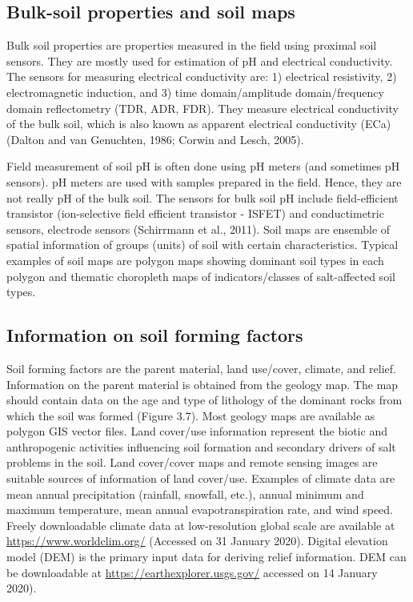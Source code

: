 \documentclass[
  10pt,
  b5paper,
]{book}
\begin{document}
\hypertarget{bulk-soil-properties-and-soil-maps}{%
\subsection{Bulk-soil properties and soil maps}\label{bulk-soil-properties-and-soil-maps}}

Bulk soil properties are properties measured in the field using proximal soil sensors. They are mostly used for estimation of pH and electrical conductivity. The sensors for measuring electrical conductivity are: 1) electrical resistivity, 2) electromagnetic induction, and 3) time domain/amplitude domain/frequency domain reflectometry (TDR, ADR, FDR). They measure electrical conductivity of the bulk soil, which is also known as apparent electrical conductivity (ECa) (Dalton and van Genuchten, 1986; Corwin and Lesch, 2005).

Field measurement of soil pH is often done using pH meters (and sometimes pH sensors). pH meters are used with samples prepared in the field. Hence, they are not really pH of the bulk soil. The sensors for bulk soil pH include field-efficient transistor (ion-selective field efficient transistor - ISFET) and conductimetric sensors, electrode sensors (Schirrmann et al., 2011).
Soil maps are ensemble of spatial information of groups (units) of soil with certain characteristics. Typical examples of soil maps are polygon maps showing dominant soil types in each polygon and thematic choropleth maps of indicators/classes of salt-affected soil types.

\hypertarget{information-on-soil-forming-factors}{%
\subsection{Information on soil forming factors}\label{information-on-soil-forming-factors}}

Soil forming factors are the parent material, land use/cover, climate, and relief. Information on the parent material is obtained from the geology map. The map should contain data on the age and type of lithology of the dominant rocks from which the soil was formed (Figure 3.7). Most geology maps are available as polygon GIS vector files.
Land cover/use information represent the biotic and anthropogenic activities influencing soil formation and secondary drivers of salt problems in the soil. Land cover/cover maps and remote sensing images are suitable sources of information of land cover/use. Examples of climate data are mean annual precipitation (rainfall, snowfall, etc.), annual minimum and maximum temperature, mean annual evapotranspiration rate, and wind speed. Freely downloadable climate data at low-resolution global scale are available at \url{https://www.worldclim.org/} (Accessed on 31 January 2020). Digital elevation model (DEM) is the primary input data for deriving relief information. DEM can be downloadable at \url{https://earthexplorer.usgs.gov/} accessed on 14 January 2020).
\end{document}

